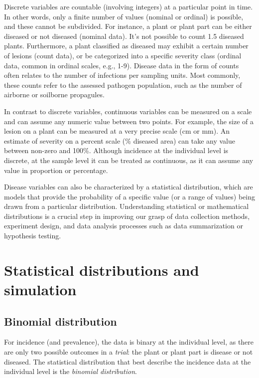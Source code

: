 \documentclass[
  letterpaper,
]{book}
\begin{document}
Discrete variables are countable (involving integers) at a particular
point in time. In other words, only a finite number of values (nominal
or ordinal) is possible, and these cannot be subdivided. For instance, a
plant or plant part can be either diseased or not diseased (nominal
data). It's not possible to count 1.5 diseased plants. Furthermore, a
plant classified as diseased may exhibit a certain number of lesions
(count data), or be categorized into a specific severity class (ordinal
data, common in ordinal scales, e.g., 1-9). Disease data in the form of
counts often relates to the number of infections per sampling units.
Most commonly, these counts refer to the assessed pathogen population,
such as the number of airborne or soilborne propagules.

In contrast to discrete variables, continuous variables can be measured
on a scale and can assume any numeric value between two points. For
example, the size of a lesion on a plant can be measured at a very
precise scale (cm or mm). An estimate of severity on a percent scale (\%
diseased area) can take any value between non-zero and 100\%. Although
incidence at the individual level is discrete, at the sample level it
can be treated as continuous, as it can assume any value in proportion
or percentage.

Disease variables can also be characterized by a statistical
distribution, which are models that provide the probability of a
specific value (or a range of values) being drawn from a particular
distribution. Understanding statistical or mathematical distributions is
a crucial step in improving our grasp of data collection methods,
experiment design, and data analysis processes such as data
summarization or hypothesis testing.

\hypertarget{statistical-distributions-and-simulation}{%
\section{Statistical distributions and
simulation}\label{statistical-distributions-and-simulation}}

\hypertarget{binomial-distribution}{%
\subsection{Binomial distribution}\label{binomial-distribution}}

For incidence (and prevalence), the data is binary at the individual
level, as there are only two possible outcomes in a \emph{trial}: the
plant or plant part is disease or not diseased. The statistical
distribution that best describe the incidence data at the individual
level is the \emph{binomial distribution}.
\end{document}
